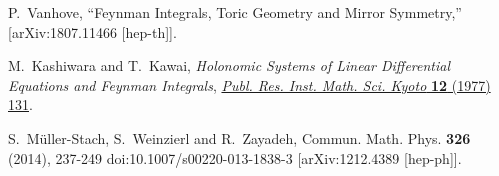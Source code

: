 \documentclass[a4paper,12pt]{article}
\numberwithin{equation}{section}
\numberwithin{figure}{section}
\begin{document}
\begin{thebibliography}{99}
P.~Vanhove,
``Feynman Integrals, Toric Geometry and Mirror Symmetry,''
[arXiv:1807.11466 [hep-th]].


M.~Kashiwara and T.~Kawai, \emph{{Holonomic Systems of Linear Differential
		Equations and Feynman Integrals}},
\href{https://doi.org/10.2977/prims/1195196602}{\emph{Publ. Res. Inst. Math.
		Sci. Kyoto} {\bfseries 12} (1977) 131}.
	
	S.~M\"uller-Stach, S.~Weinzierl and R.~Zayadeh,
	Commun. Math. Phys. \textbf{326} (2014), 237-249
	doi:10.1007/s00220-013-1838-3
	[arXiv:1212.4389 [hep-ph]].
	
\end{thebibliography}
\end{document}
